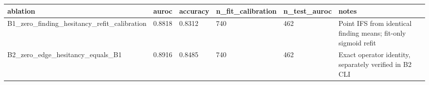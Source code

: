 \begin{tabular}{llllll}
\hline
ablation & auroc & accuracy & n\_fit\_calibration & n\_test\_auroc & notes \\
\hline
B1\_zero\_finding\_hesitancy\_refit\_calibration & 0.8818 & 0.8312 & 740 & 462 & Point IFS from identical finding means; fit-only sigmoid refit \\
B2\_zero\_edge\_hesitancy\_equals\_B1 & 0.8916 & 0.8485 & 740 & 462 & Exact operator identity, separately verified in B2 CLI \\
\hline
\end{tabular}
